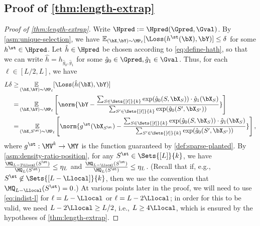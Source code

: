 \documentclass{article}
\begin{document}
\subsection{Proof of \cref{thm:length-extrap}}
\begin{proof}[Proof of \cref{thm:length-extrap}]
  Write $\Hpred := \Hpred(\Gpred, \Gval)$. 
  By \cref{asm:unique-selection}, %
  we have $ \E_{(\bX, \bY) \sim \MP_\ell}[\Loss(h^\st(\bX), \bY)] \leq \delta$ for some $h^\st \in \Hpred$. Let $\hat h \in \Hpred$ be chosen according to \cref{eq:define-hath}, so that we can write $\hat h = h_{\hat g_0, \hat g_1}$ for some $\hat g_0 \in \Gpred, \hat g_1 \in \Gval$.  Thus, for each $\ell \in [L/2,L]$, we have
  \begin{align}
    L\delta  \geq & \E_{(\bX, \bY) \sim \MP_\ell}[\Loss(\hat h(\bX), \bY)] \nonumber\\
    = &    \E_{(\bX, \bY) \sim \MP_\ell} \left[ \norm{ \bY -  \frac{\sum_{S \in \Sets{[\ell]}{k}}\exp(\hat g_0(S, \bX_S)) \cdot \hat g_1(\bX_S)}{\sum_{S' \in \Sets{[\ell]}{k}} \exp(\hat g_0(S', \bX_{S'}))} } \right]\nonumber \\
      = &    \E_{(\bX, S^\st) \sim \MP_\ell} \left[ \norm{ g^\st(\bX_{S^\st}) -  \frac{\sum_{S \in \Sets{[\ell]}{k}}\exp(\hat g_0(S, \bX_S)) \cdot \hat g_1(\bX_S)}{\sum_{S' \in \Sets{[\ell]}{k}} \exp(\hat g_0(S', \bX_{S'}))} } \right]\label{eq:indist-l},  
  \end{align}
  where $g^\st : \MV^k \to \MY$ is the function guaranteed by \cref{def:sparse-planted}. 
  By \cref{asm:density-ratio-position}, for any $S^\st \in \Sets{[L]}{k}$, we have $\frac{\MQ_{L-2\Llocal}(S^\st)}{\MQ_L(S^\st)} \leq \eta_L$ and $\frac{\MQ_{L-\Llocal}(S^\st)}{\MQ_L(S^\st)} \leq \eta_L$. (Recall that if, e.g., $S^\st \not \in \Sets{[L-\Llocal]}{k}$, then we use the convention that $\MQ_{L-\Llocal}(S^\st) = 0$.)  %
  At various points later in the proof, we will need to use \cref{eq:indist-l} for $\ell = L - \Llocal$ or $\ell = L - 2\Llocal$; in order for this to be valid, we need $L - 2\Llocal \geq L/2$, i.e., $L \geq 4\Llocal$, which is ensured by the hypotheses of \cref{thm:length-extrap}. 
  

\end{proof}
\end{document}
